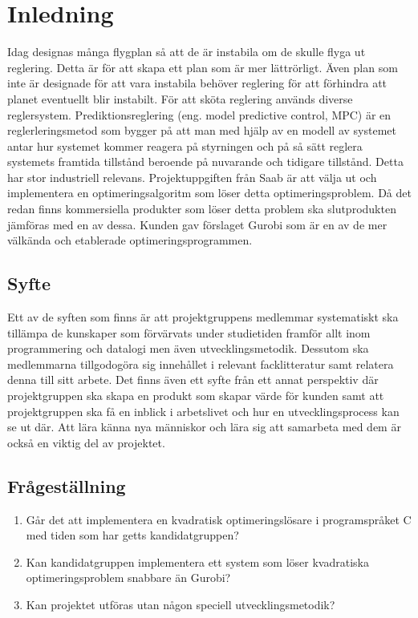 \section{Inledning}
Idag designas många flygplan så att de är instabila om de skulle flyga ut reglering. Detta är för att skapa ett plan som är mer lättrörligt. Även plan som inte är designade för att vara instabila behöver reglering för att förhindra att planet eventuellt blir instabilt. För att sköta reglering används diverse reglersystem. \citep{airplanestability}
\newline
\newline
Prediktionsreglering (eng. model predictive control, MPC) är en reglerleringsmetod som 
bygger på att man med hjälp av en modell av systemet antar hur systemet kommer reagera på styrningen och på så sätt reglera systemets framtida tillstånd beroende på nuvarande och tidigare tillstånd. Detta har stor industriell relevans. \citep[2]{ir}
\newline
\newline
Projektuppgiften från Saab är att välja ut och implementera en optimeringsalgoritm som löser detta optimeringsproblem. Då det redan finns kommersiella produkter som löser detta problem ska slutprodukten jämföras med en av dessa. Kunden gav förslaget Gurobi som är en av de mer välkända och etablerade optimeringsprogrammen.

\subsection{Syfte}
Ett av de syften som finns är att projektgruppens medlemmar systematiskt ska tillämpa de kunskaper som förvärvats under studietiden framför allt inom programmering och datalogi men även utvecklingsmetodik. Dessutom ska medlemmarna tillgodogöra sig innehållet i relevant facklitteratur samt relatera denna till sitt arbete. 
Det finns även ett syfte från ett annat perspektiv där projektgruppen ska skapa en produkt som skapar värde för kunden samt att projektgruppen ska få en inblick i arbetslivet och hur en utvecklingsprocess kan se ut där. Att lära känna nya människor och lära sig att samarbeta med dem är också en viktig del av projektet. \citep{tddd77}


\subsection{Frågeställning}
	\begin{enumerate}
		\item Går det att implementera en kvadratisk optimeringslösare i programspråket C med tiden som har getts kandidatgruppen?
		\item Kan kandidatgruppen implementera ett system som löser kvadratiska optimeringsproblem snabbare än Gurobi?
		\item Kan projektet utföras utan någon speciell utvecklingsmetodik? 
	\end{enumerate}

